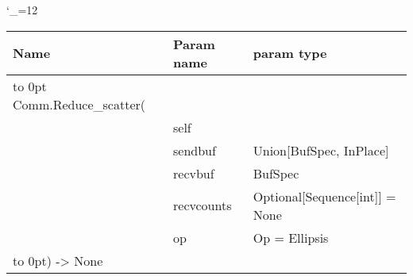 \begingroup \catcode`\_=12 \tt
\begin{tabular}{lll}
\toprule
\textrm{Name}&\textrm{Param name}&\textrm{param type}\\
\midrule
\hbox to 0pt {Comm.Reduce_scatter(\hss}\\
& self\\
& sendbuf & Union[BufSpec, InPlace]\\
& recvbuf & BufSpec\\
& recvcounts & Optional[Sequence[int]] = None\\
& op & Op = Ellipsis\\
\hbox to 0pt{) -> None\hss}\\
\bottomrule
\end{tabular}
\endgroup
